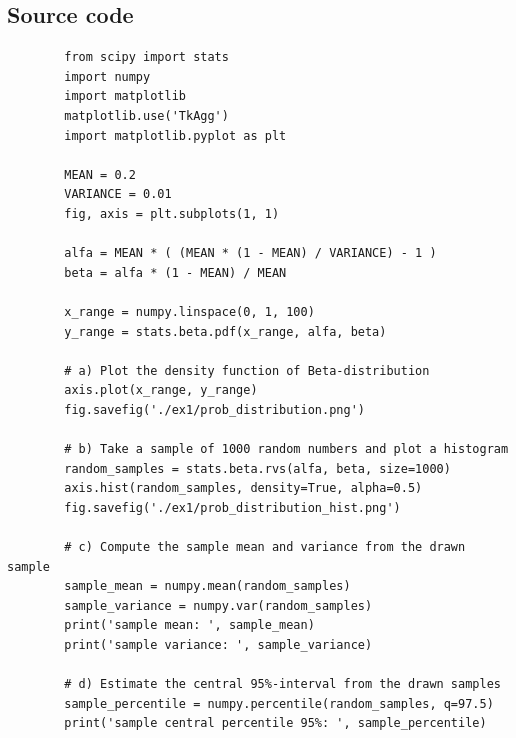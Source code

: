 \documentclass[11pt,a4paper,english]{article}
\begin{document}
    \begin{appendices}
      \section{Source code}
      \begin{verbatim}
        from scipy import stats
        import numpy
        import matplotlib
        matplotlib.use('TkAgg')
        import matplotlib.pyplot as plt

        MEAN = 0.2
        VARIANCE = 0.01
        fig, axis = plt.subplots(1, 1)

        alfa = MEAN * ( (MEAN * (1 - MEAN) / VARIANCE) - 1 )
        beta = alfa * (1 - MEAN) / MEAN

        x_range = numpy.linspace(0, 1, 100)
        y_range = stats.beta.pdf(x_range, alfa, beta)

        # a) Plot the density function of Beta-distribution
        axis.plot(x_range, y_range)
        fig.savefig('./ex1/prob_distribution.png')

        # b) Take a sample of 1000 random numbers and plot a histogram
        random_samples = stats.beta.rvs(alfa, beta, size=1000)
        axis.hist(random_samples, density=True, alpha=0.5)
        fig.savefig('./ex1/prob_distribution_hist.png')

        # c) Compute the sample mean and variance from the drawn sample
        sample_mean = numpy.mean(random_samples)
        sample_variance = numpy.var(random_samples)
        print('sample mean: ', sample_mean)
        print('sample variance: ', sample_variance)

        # d) Estimate the central 95%-interval from the drawn samples
        sample_percentile = numpy.percentile(random_samples, q=97.5)
        print('sample central percentile 95%: ', sample_percentile)
      \end{verbatim}
    \end{appendices}
  
\end{document}
